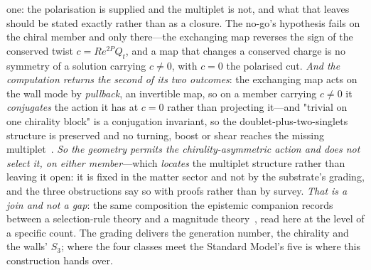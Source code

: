 \documentclass[11pt,a4paper]{article}
\theoremstyle{plain}
\theoremstyle{definition}
\theoremstyle{remark}
\begin{document}
\begin{enumerate}
{one}: the polarisation is supplied and the multiplet is not, and what that leaves should be stated
exactly rather than as a closure.  The no-go's hypothesis fails on the chiral member and only
there---the exchanging map reverses the sign of the conserved twist $c=Re^{2P}Q_{t}$, and a map
that changes a conserved charge is no symmetry of a solution carrying $c\neq0$, with $c=0$ the
polarised cut.  \emph{And the computation returns the second of its two
outcomes}: the exchanging map acts on the wall
mode by \emph{pullback}, an invertible map, so on a member carrying $c\neq0$ it \emph{conjugates} the
action it has at $c=0$ rather than projecting it---and "trivial on one chirality block" is a
conjugation invariant, so the doublet-plus-two-singlets structure is preserved and no turning, boost or
shear reaches the missing multiplet~\cite{JanzenMatter}.  \emph{So the geometry permits the
chirality-asymmetric action and does not select it, on either member}---which \emph{locates} the
multiplet structure rather than leaving it open: it is fixed in the matter sector and not by the
substrate's grading, and the three obstructions say so with proofs rather than by survey.  \emph{That is
a join and not a gap}: the same composition the epistemic companion records between a selection-rule
theory and a magnitude theory~\cite{JanzenShadowExistence}, read here at the level of a specific count.
The grading delivers the generation number, the chirality and the walls' $S_3$; where the four
classes meet the Standard Model's five is where this construction hands over.


\end{enumerate}
\end{document}
